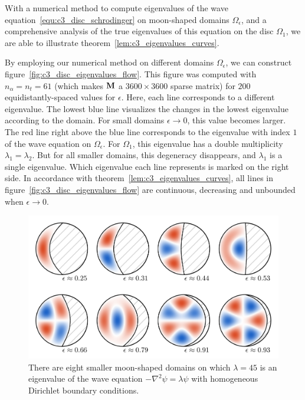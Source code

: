 With a numerical method to compute eigenvalues of the wave equation~\eqref{equ:c3_disc_schrodinger} on moon-shaped domains $\Omega_\epsilon$, and a comprehensive analysis of the true eigenvalues of this equation on the disc $\Omega_1$, we are able to illustrate theorem~\ref{lem:c3_eigenvalues_curves}.

By employing our numerical method on different domains $\Omega_\epsilon$, we can construct figure~\ref{fig:c3_disc_eigenvalues_flow}. This figure was computed with $n_\alpha = n_t = 61$ (which makes $\vb{M}$ a $3600\times3600$ sparse matrix) for $200$ equidistantly-spaced values for $\epsilon$. Here, each line corresponds to a different eigenvalue. The lowest blue line visualizes the changes in the lowest eigenvalue according to the domain. For small domains $\epsilon \to 0$, this value becomes larger. The red line right above the blue line corresponds to the eigenvalue with index $1$ of the wave equation on $\Omega_\epsilon$. For $\Omega_1$, this eigenvalue has a double multiplicity $\lambda_1 = \lambda_2$. But for all smaller domains, this degeneracy disappears, and $\lambda_1$ is a single eigenvalue. Which eigenvalue each line represents is marked on the right side. In accordance with theorem~\ref{lem:c3_eigenvalues_curves}, all lines in figure~\ref{fig:c3_disc_eigenvalues_flow} are continuous, decreasing and unbounded when $\epsilon \to 0$.


\begin{figure}
  \begin{center}
    \includegraphics[width=\textwidth]{img/chapter3/on_disc/solutions.png}
    \caption{There are eight smaller moon-shaped domains on which $\lambda = 45$ is an eigenvalue of the wave equation $-\nabla^2 \psi = \lambda \psi$ with homogeneous Dirichlet boundary conditions.}
    \label{fig:c3_disc_solutions}
  \end{center}
\end{figure}


